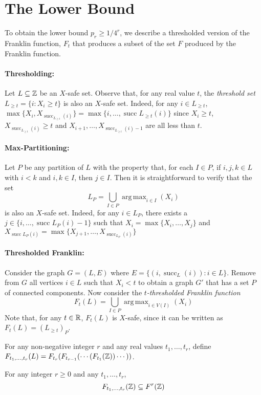 \documentclass{patmorin}
\DeclareMathOperator*{\argmax}{arg\,max}
\DeclareMathOperator{\cw}{succ}
\begin{document}
\section{The Lower Bound}

To obtain the lower bound $p_r \ge 1/4^r$, we describe a thresholded
version of the Franklin function, $F_t$ that produces a subset of the
set $F$ produced by the Franklin function.  

\paragraph{Thresholding:}
Let $L\subseteq\mathbb{Z}$ be an $X$-safe set.  Observe that, for any real
value $t$, the \emph{threshold set} $L_{\ge t}=\{i:X_i\ge t\}$ is also an
$X$-safe set. Indeed, for any $i\in L_{\ge t}$, $\max\{X_i,X_{\cw_{L_{\ge t}}(i)}\} = \max\{i,\ldots,\cw{L_{\ge t}}(i)\}$ since $X_i\ge t$, $X_{\cw_{L_{\ge t}}(i)}\ge t$ and $X_{i+1},\ldots,X_{\cw_{L_{\ge t}}(i)-1}$ are all less than $t$.

\paragraph{Max-Partitioning:}
Let $P$ be any partition of $L$ with the property that, for each $I\in
P$, if $i,j,k\in L$ with $i < k$ and $i,k\in I$, then $j\in I$. Then it
is straightforward to verify that the set
\[
     L_{P} = \bigcup_{I\in P} \argmax_{i\in I}(X_i)
\]
is also an $X$-safe set. Indeed, for any $i\in L_{P}$, there exists a $j\in\{i,\ldots,\cw{L_P}(i)-1\}$ such that $X_i=\max\{X_i,\ldots,X_j\}$ and $X_{\cw{L_P}(i)}=\max\{X_{j+1},\ldots,X_{\cw_{L_P}(i)}\}$

\paragraph{Thresholded Franklin:}
Consider the graph $G=(L,E)$ where $E=\{(i,\cw_L(i)): i\in L\}$. Remove
from $G$ all vertices $i\in L$ such that $X_i < t$ to obtain a graph
$G'$ that has a set $P$ of connected components.  Now consider the
\emph{$t$-thresholded Franklin function}
\[
    F_t(L) = \bigcup_{I\in P} \argmax_{i\in V(I)}(X_i)
\]
Note that, for any $t\in\mathbb{R}$, $F_t(L)$ is $X$-safe, since it can be
written as $F_t(L) = (L_{\ge t})_P$.

For any non-negative integer $r$ and any real values $t_1,\ldots,t_r$,
define $F_{t_1,\ldots,t_r}(L) = F_{t_r}(F_{t_{r-1}}(\cdots(F_{t_1}(\mathbb{Z}))\cdots ))$.

\begin{lem}
   For any integer $r\ge 0$ and any $t_1,\ldots,t_r$,
   \[  F_{t_1,\ldots,t_r}(\mathbb{Z}) \subseteq F^{r}(\mathbb{Z})   \]
\end{lem}
\end{document}
